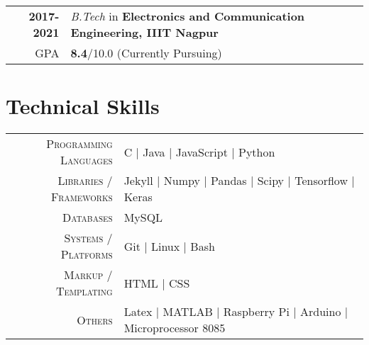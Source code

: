 \documentclass[a4paper,10pt]{extarticle} %
\begin{document}
\begin{tabular}{r|p{17.5cm}}	
\textbf{2017-2021} & \textit{B.Tech} in \textbf{Electronics and Communication Engineering, IIIT Nagpur}\\
\hfill GPA & \textbf{8.4}/10.0 (Currently Pursuing)\\
\end{tabular}


\section{\textcolor{primary}{Technical Skills}}

\begin{tabular}{r|p{15cm}}
\textsc{Programming Languages} & C | Java | JavaScript | Python  \\
\textsc{Libraries / Frameworks} & Jekyll | Numpy | Pandas | Scipy | Tensorflow | Keras\\
\textsc{Databases} & MySQL \\
\textsc{Systems / Platforms} & Git | Linux | Bash\\
\textsc{Markup / Templating} & HTML | CSS \\
\textsc{Others} &  Latex | MATLAB | Raspberry Pi | Arduino | Microprocessor 8085
\end{tabular}




\end{document}
